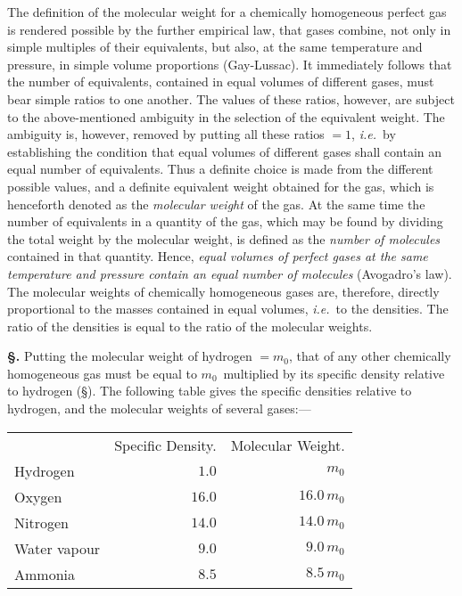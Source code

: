 \documentclass[12pt]{book}[2005/09/16]
\newcommand{\TableFont}{\footnotesize}%
\newcommand{\ColHead}[1]{\multicolumn{1}{c}{#1}}
\newcommand{\Section}[1]{
  \medskip\par\textbf{§\;#1}
  \label{section:#1}
}
\newcommand{\SecRef}[2][§\;]{\hyperref[section:#2.]{{\upshape #1#2}}}
\newcommand{\PageSep}[1]{\ignorespaces}
\newcommand{\ie}{\emph{i.e.}}
\begin{document}
The definition of the molecular weight for a chemically
homogeneous perfect gas is rendered possible by the further
empirical law, that gases combine, not only in simple
multiples of their equivalents, but also, at the same temperature
and pressure, in simple volume proportions (Gay-Lussac).
%
%
It immediately follows that the number of equivalents, contained
in equal volumes of different gases, must bear simple
ratios to one another. The values of these ratios, however,
are subject to the above-mentioned ambiguity in the
selection of the equivalent weight. The ambiguity is,
however, removed by putting all these ratios $= 1$, \ie\ by
establishing the condition that equal volumes of different
gases shall contain an equal number of equivalents. Thus
a definite choice is made from the different possible values,
and a definite equivalent weight obtained for the gas, which
is henceforth denoted as the \emph{molecular weight} of the gas. At
the same time the number of equivalents in a quantity of
the gas, which may be found by dividing the total weight
by the molecular weight, is defined as the \emph{number of
\PageSep{25}
molecules} contained in that quantity. Hence, \emph{equal volumes
of perfect gases at the same temperature and pressure contain
an equal number of molecules} (Avogadro's law). The molecular
%
%
%
weights of chemically homogeneous gases are, therefore,
directly proportional to the masses contained in equal
volumes, \ie\ to the densities. The ratio of the densities is
equal to the ratio of the molecular weights.

\Section{37.} Putting the molecular weight of hydrogen $= m_{0}$,
that of any other chemically homogeneous gas must be
equal to $m_{0}$~multiplied by its specific density relative to
hydrogen (\SecRef{11}). The following table gives the specific
densities relative to hydrogen, and the molecular weights of
several gases:---
\begin{center}
\TableFont
\begin{tabular}{lr<{\qquad} r<{\qquad}}
                 & \ColHead{Specific Density.} & \ColHead{Molecular Weight.} \\
Hydrogen & $1.0$  & $m_{0}$ \\
Oxygen & $16.0$ & $16.0\, m_{0}$ \\
Nitrogen & $14.0$ & $14.0\, m_{0}$ \\
Water vapour & $9.0$ & $9.0\, m_{0}$ \\
Ammonia & $8.5$ & $8.5\, m_{0}$ \\
\end{tabular}
\end{center}
\end{document}
